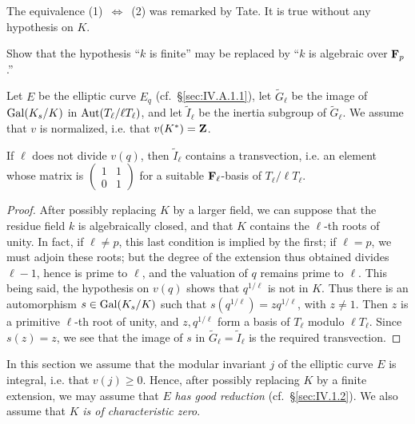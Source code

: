 
The equivalence (1)~$\Longleftrightarrow$~(2) was remarked by Tate. It
is true without any hypothesis on $K$.


Show that the hypothesis ``$k$ is finite'' may be replaced by ``$k$ is
algebraic over $\mathbf{F}_p$.''


Let $E$ be the elliptic curve $E_q$ (cf.~\S\ref{sec:IV.A.1.1}), let
$\widetilde{G}_\ell$ be the image of $\mathrm{Gal}(K_s/K)$ in
$\mathrm{Aut}(T_\ell/\ell T_\ell)$, and let $\widetilde{I}_\ell$ be the inertia
subgroup of $\widetilde{G}_\ell$. We assume that $v$ is normalized, i.e.
that $v(K^*)=\mathbf{Z}$.

\begin{proposition}
If $\ell$ does not divide $v(q)$, then $\widetilde{I}_\ell$ contains a
transvection, i.e. an element whose matrix is
$\begin{pmatrix} 1 & 1 \\ 0 & 1 \end{pmatrix}$ for a suitable
$\mathbf{F}_\ell$-basis of $T_\ell/\ell T_\ell$.
\end{proposition}

\begin{proof}
After possibly replacing $K$ by a larger field, we can suppose that the
residue field $k$ is algebraically closed, and that $K$ contains the
$\ell$-th roots of unity. In fact, if $\ell\neq p$, this last condition
is implied by the first; if $\ell=p$, we must adjoin these roots; but
the degree of the extension thus obtained divides $\ell-1$, hence is
prime to $\ell$, and the valuation of $q$ remains prime to $\ell$. This
being said, the hypothesis on $v(q)$ shows that $q^{1/\ell}$ is not in
$K$. Thus there is an automorphism $s\in\mathrm{Gal}(K_s/K)$ such that
$s(q^{1/\ell})=zq^{1/\ell}$, with $z\neq 1$. Then $z$ is a primitive
$\ell$-th root of unity, and $z, q^{1/\ell}$ form a basis of $T_\ell$
modulo $\ell T_\ell$. Since $s(z)=z$, we see that the image of $s$ in
$\widetilde{G}_\ell=\widetilde{I}_\ell$ is the required transvection.
\end{proof}


In this section we assume that the modular invariant $j$ of the elliptic
curve $E$ is integral, i.e. that $v(j)\geq 0$. Hence, after possibly
replacing $K$ by a finite extension, we may assume that $E$
\emph{has good reduction} (cf.~\S\ref{sec:IV.1.2}). We also assume that
$K$ \emph{is of characteristic zero}.

